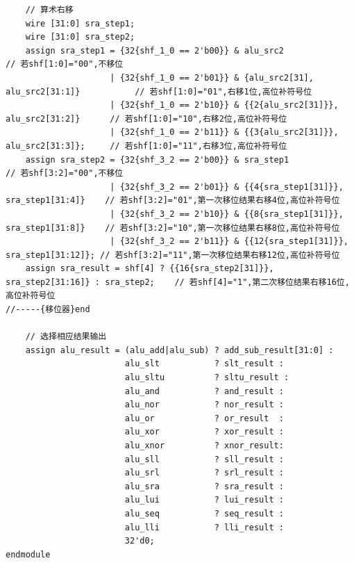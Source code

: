 \documentclass{article}
\begin{document}
\begin{verbatim}
    // 算术右移
    wire [31:0] sra_step1;
    wire [31:0] sra_step2;
    assign sra_step1 = {32{shf_1_0 == 2'b00}} & alu_src2                                 // 若shf[1:0]="00",不移位
                     | {32{shf_1_0 == 2'b01}} & {alu_src2[31], alu_src2[31:1]}           // 若shf[1:0]="01",右移1位,高位补符号位
                     | {32{shf_1_0 == 2'b10}} & {{2{alu_src2[31]}}, alu_src2[31:2]}      // 若shf[1:0]="10",右移2位,高位补符号位
                     | {32{shf_1_0 == 2'b11}} & {{3{alu_src2[31]}}, alu_src2[31:3]};     // 若shf[1:0]="11",右移3位,高位补符号位
    assign sra_step2 = {32{shf_3_2 == 2'b00}} & sra_step1                                // 若shf[3:2]="00",不移位
                     | {32{shf_3_2 == 2'b01}} & {{4{sra_step1[31]}}, sra_step1[31:4]}    // 若shf[3:2]="01",第一次移位结果右移4位,高位补符号位
                     | {32{shf_3_2 == 2'b10}} & {{8{sra_step1[31]}}, sra_step1[31:8]}    // 若shf[3:2]="10",第一次移位结果右移8位,高位补符号位
                     | {32{shf_3_2 == 2'b11}} & {{12{sra_step1[31]}}, sra_step1[31:12]}; // 若shf[3:2]="11",第一次移位结果右移12位,高位补符号位
    assign sra_result = shf[4] ? {{16{sra_step2[31]}}, sra_step2[31:16]} : sra_step2;    // 若shf[4]="1",第二次移位结果右移16位,高位补符号位
//-----{移位器}end

    // 选择相应结果输出
    assign alu_result = (alu_add|alu_sub) ? add_sub_result[31:0] : 
                        alu_slt           ? slt_result :
                        alu_sltu          ? sltu_result :
                        alu_and           ? and_result :
                        alu_nor           ? nor_result :
                        alu_or            ? or_result  :
                        alu_xor           ? xor_result :
                        alu_xnor          ? xnor_result:
                        alu_sll           ? sll_result :
                        alu_srl           ? srl_result :
                        alu_sra           ? sra_result :
                        alu_lui           ? lui_result :
                        alu_seq           ? seq_result :
                        alu_lli           ? lli_result :
                        32'd0;
endmodule
\end{verbatim}
\end{document}
